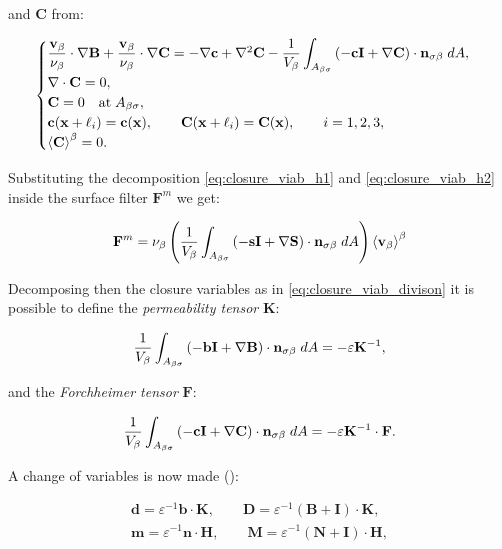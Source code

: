 \newpage
and $\mathbf{C}$ from:

\begin{eqnarray}
	\begin{cases}
		\dfrac{\textbf{v}_{\beta}}{\nu_{\beta}} \cdot  \nabla \mathbf{B} +\dfrac{\textbf{v}_{\beta}}{\nu_{\beta}} \cdot  \nabla \mathbf{C} = -\nabla \mathbf{c} +  \nabla^2 \mathbf{C} - \dfrac{1}{V_\beta} \displaystyle \int_{A_{\beta \sigma}}  \left(-\mathbf{c}\mathbf{I}  +  \nabla \mathbf{C} \right) \cdot \mathbf{n}_{\sigma \beta} \;dA,  \\
		\nabla \cdot \mathbf{C} = 0, \\
		\mathbf{C} = 0 \quad \textrm{at} \; A_{\beta \sigma}, \\
		\mathbf{c}(\mathbf{x} +\ell_i) = \mathbf{c}(\mathbf{x}), \qquad \mathbf{C}(\mathbf{x} +\ell_i) = \mathbf{C}(\mathbf{x}), \qquad i=1,2,3 ,\\
		{\left< \mathbf{C} \right>}^{\beta} = 0.
	\end{cases}
\label{eq:C_problem}
\end{eqnarray}

\noindent Substituting the decomposition \eqref{eq:closure_viab_h1} and \eqref{eq:closure_viab_h2} inside the surface filter $\mathbf{F}^m$ we get:

$$
\mathbf{F}^m = \nu_{\beta} \left(\dfrac{1}{V_\beta} \int_{A_{\beta \sigma}}  \left(-\mathbf{s}\mathbf{I}  +  \nabla \mathbf{S} \right) \cdot \mathbf{n}_{\sigma \beta} \;dA \right) {\left< \textbf{v}_{\beta} \right>}^{\beta}
$$

\noindent Decomposing then the closure variables as in \eqref{eq:closure_viab_divison} it is possible to define the \textit{permeability tensor} $\mathbf{K}$:

$$
 \dfrac{1}{V_\beta} \int_{A_{\beta \sigma}}  \left(-\mathbf{b}\mathbf{I}  +  \nabla \mathbf{B} \right) \cdot \mathbf{n}_{\sigma \beta} \;dA = -\varepsilon \mathbf{K}^{-1},
$$

\noindent and the \textit{Forchheimer tensor} $\mathbf{F}$:

$$
\dfrac{1}{V_\beta} \int_{A_{\beta \sigma}} \left(-\mathbf{c}\mathbf{I}  +  \nabla \mathbf{C} \right) \cdot \mathbf{n}_{\sigma \beta} \;dA = -\varepsilon \mathbf{K}^{-1} \cdot \mathbf{F}.
$$

\noindent A change of variables is now made (\citet{barrere1992closure}):


\begin{eqnarray}
	\mathbf{d} = \varepsilon^{-1} \mathbf{b} \cdot \mathbf{K}, \qquad \mathbf{D} = \varepsilon^{-1} \left(\mathbf{B} + \mathbf{I} \right)\cdot \mathbf{K}, \\
\mathbf{m} = \varepsilon^{-1} \mathbf{n} \cdot \mathbf{H}, \qquad \mathbf{M} = \varepsilon^{-1} \left(\mathbf{N} + \mathbf{I} \right)\cdot \mathbf{H}, \label{eq:barrere2}
\end{eqnarray}


